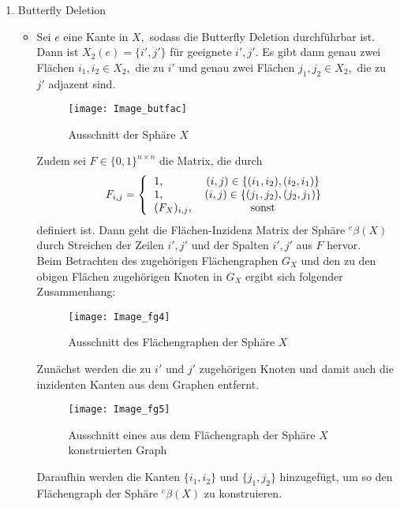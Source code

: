 \documentclass[12pt,titlepage,twoside,cleardoublepage]{article}
\theoremstyle{nummermitklammern}
\numberwithin{equation}{section}
\begin{document}
\begin{enumerate}
\item Butterfly Deletion
\begin{itemize}
\item Sei $e$ eine Kante in $X,$ sodass die Butterfly Deletion durchführbar ist. Dann ist $X_2(e)=\{i',j'\}$ für geeignete $i',j'.$ Es gibt dann genau zwei Flächen $i_1,i_2\in X_2,$ die zu $i'$ und genau zwei Flächen $j_1,j_2\in X_2,$ die zu $j'$ adjazent sind. 
\begin{figure}[H]
\begin{center}
\texttt{[image: Image\_butfac]}
\end{center}
\caption{Ausschnitt der Sphäre $X$}
\end{figure}
Zudem sei $F\in \{0,1\}^{n\times n}$ die Matrix, die durch
 \[
F_{i,j}=
\Biggl{\{\begin{tabular}[l]{lcr}
1,&\textcolor{black}{$(i,j)\in \{(i_1,i_2),(i_2,i_1)\}$} \\
1,&\textcolor{black}{$(i,j)\in \{(j_1,j_2),(j_2,j_1)\}$} \\
$(F_{X})_{i,j}$,& sonst\\
\end{tabular}}
\] definiert ist. Dann geht die Flächen-Inzidenz Matrix der Sphäre ${}^e\beta(X)$ durch Streichen der Zeilen $i',j'$ und der Spalten $i',j'$ aus $F$ hervor.\\
Beim Betrachten des zugehörigen Flächengraphen $G_X$ und den zu den obigen Flächen zugehörigen Knoten in $G_X$ ergibt sich folgender Zusammenhang:
\begin{figure}[H]
\begin{center}
\texttt{[image: Image\_fg4]}
\end{center}
\caption{Ausschnitt des Flächengraphen der Sphäre $X$}
\end{figure}
Zunächst werden die zu $i'$ und $j'$ zugehörigen Knoten und damit auch die inzidenten Kanten aus dem Graphen entfernt. 
\begin{figure}[H]
\begin{center}
\texttt{[image: Image\_fg5]}
\end{center}
\caption{Ausschnitt eines aus dem Flächengraph der Sphäre $X$ konstruierten Graph}
\end{figure}
Daraufhin werden die Kanten $\{i_1,i_2\}$ und $\{j_1,j_2\}$ hinzugefügt, um so den Flächengraph der Sphäre ${}^e\beta(X)$ zu konstruieren. 
\begin{figure}[H]

\end{figure}
\end{itemize}
\end{enumerate}
\end{document}
